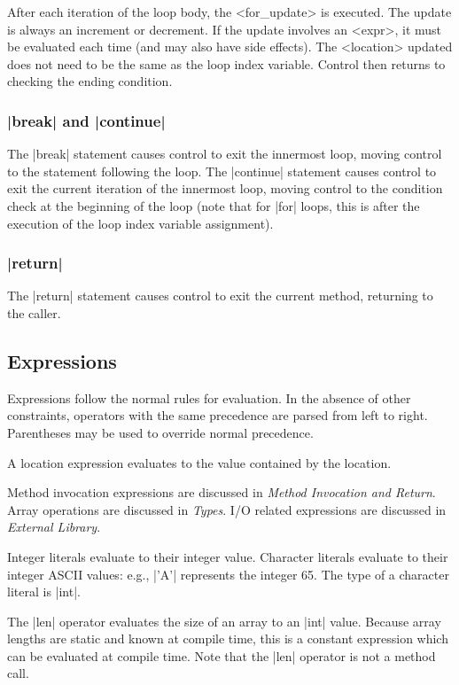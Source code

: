 \documentclass[11pt]{article}
\begin{document}
After each iteration of the loop body, the {\bnf <for_update>} is executed.
The update is always an increment or decrement.
If the update involves an {\bnf <expr>}, it must be evaluated each time (and may also have side effects).
The {\bnf <location>} updated does not need to be the same as the loop index variable.
Control then returns to checking the ending condition.

\subsubsection{\decaf|break| and \decaf|continue|}
The \decaf|break| statement causes control to exit the innermost loop, moving control to the statement following the loop.
The \decaf|continue| statement causes control to exit the current iteration of the innermost loop, moving control to the condition check at the beginning of the loop (note that for \decaf|for| loops, this is after the execution of the loop index variable assignment).

\subsubsection{\decaf|return|}
The \decaf|return| statement causes control to exit the current method, returning to the caller.

\subsection{Expressions}

Expressions follow the normal rules for evaluation.
In the absence of other constraints, operators with the same precedence are parsed from left to right.
Parentheses may be used to override normal precedence.

A location expression evaluates to the value contained by the location.

Method invocation expressions are discussed in {\em Method Invocation and Return}.
Array operations are discussed in {\em Types}.
I/O related expressions are discussed in {\em External Library}.

Integer literals evaluate to their integer value.
Character literals evaluate to their integer ASCII values: e.g., \decaf|'A'| represents the integer 65.
The type of a character literal is \decaf|int|.

The \decaf|len| operator evaluates the size of an array to an \decaf|int| value.
Because array lengths are static and known at compile time, this is a constant expression which can be evaluated at compile time.
Note that the \decaf|len| operator is not a method call.
\end{document}
